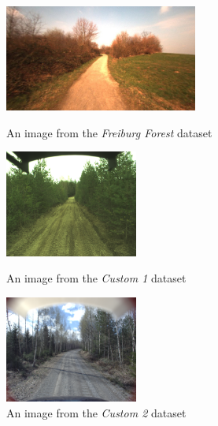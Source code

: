 \documentclass[USenglish]{ifimaster}  %
\begin{document}
\begin{figure}[!htb]
  \includegraphics[width=\linewidth, height=3.5cm]{bilder/freiburg.png}
  \caption{An image from the \textit{Freiburg Forest} dataset}\label{fig:awesome_image1}
\endminipage\hfill
{}
  \includegraphics[width=\linewidth, height=3.5cm]{bilder/custom_1.png}
  \caption{An image from the \textit{Custom 1} dataset}\label{fig:awesome_image2}
\endminipage\hfill
{}%
  \includegraphics[width=\linewidth, height=3.5cm]{bilder/custom_2.png}
  \caption{An image from the \textit{Custom 2} dataset}\label{fig:awesome_image3}
\endminipage
\end{figure}
\end{document}
